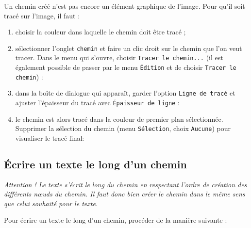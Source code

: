 Un chemin créé n'est pas encore un élément graphique de l'image. Pour qu'il soit tracé sur l'image, il faut : 

\begin{enumerate}
\item choisir la couleur dans laquelle le chemin doit être tracé ;
\item sélectionner l'onglet \texttt{chemin} et faire un clic droit sur le chemin que l'on veut tracer. Dans le menu qui s'ouvre, choisir \texttt{Tracer le chemin...} (il est également possible de passer par le menu \texttt{Édition} et de choisir \texttt{Tracer le chemin}) : 
\item dans la boîte de dialogue qui apparaît, garder l'option \texttt{Ligne de tracé} et ajuster l'épaisseur du tracé avec \texttt{Épaisseur de ligne} :
\item le chemin est alors tracé dans la couleur de premier plan sélectionnée. Supprimer la sélection du chemin (menu \texttt{Sélection}, choix \texttt{Aucune}) pour visualiser le tracé final:
\end{enumerate}

\subsection{Écrire un texte le long d'un chemin}\label{Gimp3cheminTexte} 

\emph{Attention ! Le texte s'écrit le long du chemin en respectant l'ordre de création des différents nœuds du chemin. Il faut donc bien créer le chemin dans le même sens que celui souhaité pour le texte.}

\vspace{6pt}

Pour écrire un texte le long d'un chemin, procéder de la manière suivante : 


